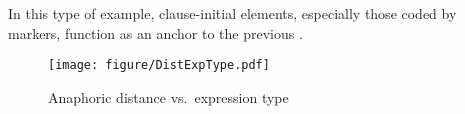
In this type of example,
clause-initial elements, especially those coded by  markers, function as an anchor to the previous .

\begin{figure}
	\begin{center}
	\texttt{[image: figure/DistExpType.pdf]}
	\caption{Anaphoric distance vs.\ expression type}
	\label{DistExpTypeF}
	\end{center}
\end{figure}


